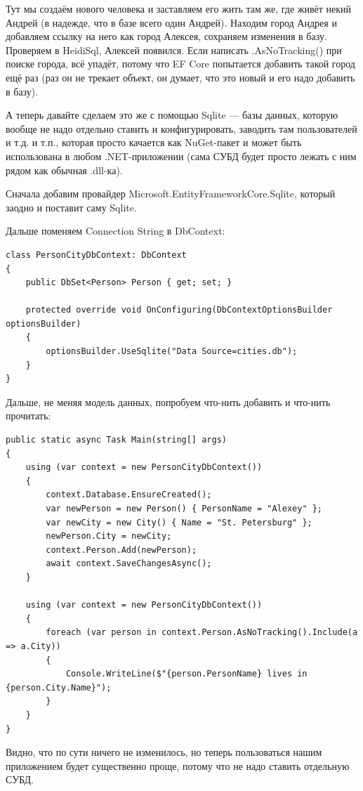 \documentclass[a5paper]{article}
\begin{document}
Тут мы создаём нового человека и заставляем его жить там же, где живёт некий Андрей (в надежде, что в базе всего один Андрей). Находим город Андрея и добавляем ссылку на него как город Алексея, сохраняем изменения в базу. Проверяем в HeidiSql, Алексей появился. Если написать .AsNoTracking() при поиске города, всё упадёт, потому что EF Core попытается добавить такой город ещё раз (раз он не трекает объект, он думает, что это новый и его надо добавить в базу).

А теперь давайте сделаем это же с помощью Sqlite --- базы данных, которую вообще не надо отдельно ставить и конфигурировать, заводить там пользователей и т.д. и т.п., которая просто качается как NuGet-пакет и  может быть использована в любом .NET-приложении (сама СУБД будет просто лежать с ним рядом как обычная .dll-ка).

Сначала добавим провайдер Microsoft.EntityFrameworkCore.Sqlite, который заодно и поставит саму Sqlite.

Дальше поменяем Connection String в DbContext:

\begin{verbatim}
class PersonCityDbContext: DbContext
{
    public DbSet<Person> Person { get; set; }

    protected override void OnConfiguring(DbContextOptionsBuilder optionsBuilder)
    {
        optionsBuilder.UseSqlite("Data Source=cities.db");
    }
}
\end{verbatim}

Дальше, не меняя модель данных, попробуем что-нить добавить и что-нить прочитать:

\begin{verbatim}
public static async Task Main(string[] args)
{
    using (var context = new PersonCityDbContext())
    {
        context.Database.EnsureCreated();
        var newPerson = new Person() { PersonName = "Alexey" };
        var newCity = new City() { Name = "St. Petersburg" };
        newPerson.City = newCity;
        context.Person.Add(newPerson);
        await context.SaveChangesAsync();
    }

    using (var context = new PersonCityDbContext())
    {
        foreach (var person in context.Person.AsNoTracking().Include(a => a.City))
        {
            Console.WriteLine($"{person.PersonName} lives in {person.City.Name}");
        }
    }
}
\end{verbatim}

Видно, что по сути ничего не изменилось, но теперь пользоваться нашим приложением будет существенно проще, потому что не надо ставить отдельную СУБД.
\end{document}
